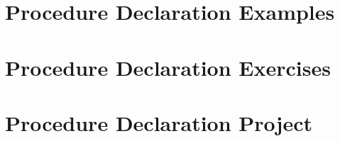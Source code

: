 


\clearpage
\section{Procedure Declaration Examples} %
\label{sec:procedure_declaration_examples}




\clearpage
\section{Procedure Declaration Exercises} %
\label{sec:procedure_declaration_exercises}




\clearpage
\section{Procedure Declaration Project} %
\label{sec:procedure_declaration_project}



